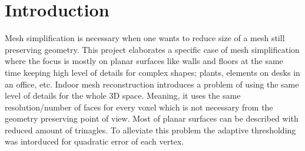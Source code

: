 \chapter{Introduction}
\setcounter{page}{1}%
\thispagestyle{empty}

Mesh simplification is necessary when one wants to reduce size of a mesh still preserving geometry. This project elaborates a specific case of mesh simplification where the focus is mostly on planar surfaces like walls and floors at the same time keeping high level of details for complex shapes; plants, elements on desks in an office, etc. Indoor mesh reconstruction introduces a problem of using the same level of details for the whole 3D space. Meaning, it uses the same resolution/number of faces for every voxel which is not necessary from the geometry preserving point of view. Most of planar surfaces can be described with reduced amount of trinagles. To alleviate this problem the adaptive thresholding was intorduced for quadratic error of each vertex.